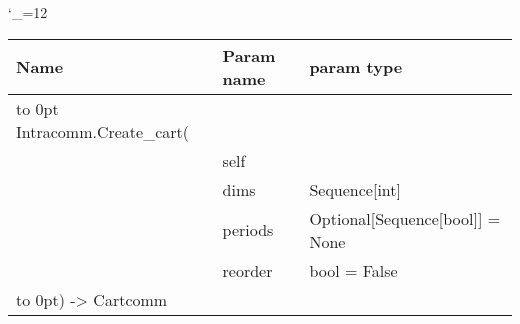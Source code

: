 \begingroup \catcode`\_=12 \tt
\begin{tabular}{lll}
\toprule
\textrm{Name}&\textrm{Param name}&\textrm{param type}\\
\midrule
\hbox to 0pt {Intracomm.Create_cart(\hss}\\
& self\\
& dims & Sequence[int]\\
& periods & Optional[Sequence[bool]] = None\\
& reorder & bool = False\\
\hbox to 0pt{) -> Cartcomm\hss}\\
\bottomrule
\end{tabular}
\endgroup
